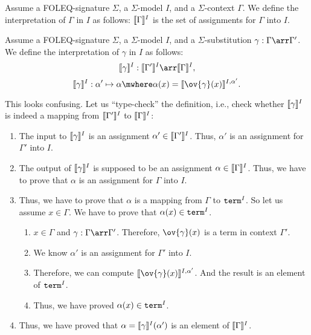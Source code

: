 \begin{definition}
Assume a FOLEQ-signature $\Sigma$, a $\Sigma$-model $I$, and a $\Sigma$-context $\Gamma$. We define the interpretation of $\Gamma$ in $I$ as follows: $\llbracket \Gamma\rrbracket^{I}$ is the set of assignments for $\Gamma$ into $I$.
\end{definition}

\begin{definition}
Assume a FOLEQ-signature $\Sigma$, a $\Sigma$-model $I$, and a $\Sigma$-substitution $\gamma:\Gamma\arr\Gamma'$. We define the interpretation of $\gamma$ in $I$ as follows:
 \[\semm{\gamma}{I}:\semm{\Gamma'}{I}\arr\semm{\Gamma}{I},\]
 \[\semm{\gamma}{I}:\alpha'\mapsto \alpha \mwhere \alpha(x)=\semm{\ov{\gamma}(x)}{I,\alpha'}.\]
\end{definition}

This looks confusing. Let us ``type-check'' the definition, i.e., check whether $\llbracket \gamma\rrbracket^{I}$ is indeed a mapping from $\llbracket \Gamma'\rrbracket^{I}$ to $\llbracket \Gamma\rrbracket^{I}$:
\begin{enumerate}
\item The input to $\llbracket \gamma\rrbracket^{I}$ is an assignment $\alpha'\in\llbracket \Gamma'\rrbracket^{I}$. Thus, $\alpha'$ is an assignment for $\Gamma'$ into $I$.
\item The output of $\llbracket \gamma\rrbracket^{I}$ is supposed to be an assignment $\alpha\in\llbracket \Gamma\rrbracket^{I}$. Thus, we have to prove that $\alpha$ is an assignment for $\Gamma$ into $I$.
\item Thus, we have to prove that $\alpha$ is a mapping from $\Gamma$ to $\mathtt{term}^I$. So let us assume $x\in\Gamma$. We have to prove that $\alpha(x)\in \mathtt{term}^I$.
 \begin{enumerate}
    \item $x\in \Gamma$ and $\gamma:\Gamma\arr\Gamma'$. Therefore, $\ov{\gamma}(x)$ is a term in context $\Gamma'$.
    \item We know $\alpha'$ is an assignment for $\Gamma'$ into $I$.
    \item Therefore, we can compute $\semm{\ov{\gamma}(x)}{I,\alpha'}$. And the result is an element of $\mathtt{term}^I$.
    \item Thus, we have proved $\alpha(x)\in \mathtt{term}^I$.
 \end{enumerate}
\item Thus, we have proved that $\alpha=\llbracket \gamma\rrbracket^{I}(\alpha')$ is an element of $\llbracket \Gamma\rrbracket^{I}$.
\end{enumerate}

